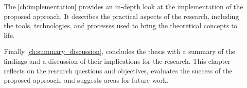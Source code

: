 The \cref{ch:implementation} provides an in-depth look at the implementation of the proposed approach. 
It describes the practical aspects of the research, including the tools, technologies, and processes used to bring the theoretical concepts to life.

Finally \cref{ch:summary_discussion}, concludes the thesis with a summary of the findings and a discussion of their implications for the research. 
This chapter reflects on the research questions and objectives, evaluates the success of the proposed approach, and suggests areas for future work.